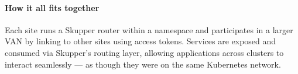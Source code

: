 \paragraph{How it all fits together}
Each site runs a Skupper router within a namespace and participates in a larger VAN by linking to other sites using access tokens. Services are exposed and consumed via Skupper's routing layer, allowing applications across clusters to interact seamlessly — as though they were on the same Kubernetes network.

